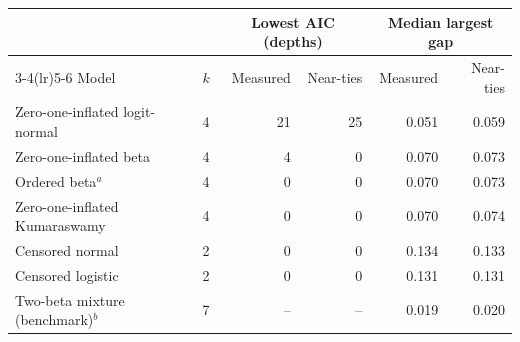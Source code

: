 \setlength{\tabcolsep}{5pt}
\begin{tabular}{lcrrrr}
\toprule
 & & \multicolumn{2}{c}{Lowest AIC (depths)} & \multicolumn{2}{c}{Median largest gap} \\
\cmidrule(lr){3-4}\cmidrule(lr){5-6}
Model & $k$ & Measured & Near-ties & Measured & Near-ties \\
\midrule
Zero-one-inflated logit-normal & 4 & 21 & 25 & 0.051 & 0.059 \\
Zero-one-inflated beta & 4 & 4 & 0 & 0.070 & 0.073 \\
Ordered beta$^{a}$ & 4 & 0 & 0 & 0.070 & 0.073 \\
Zero-one-inflated Kumaraswamy & 4 & 0 & 0 & 0.070 & 0.074 \\
Censored normal & 2 & 0 & 0 & 0.134 & 0.133 \\
Censored logistic & 2 & 0 & 0 & 0.131 & 0.131 \\
\midrule
Two-beta mixture (benchmark)$^{b}$ & 7 & -- & -- & 0.019 & 0.020 \\
\bottomrule
\end{tabular}
